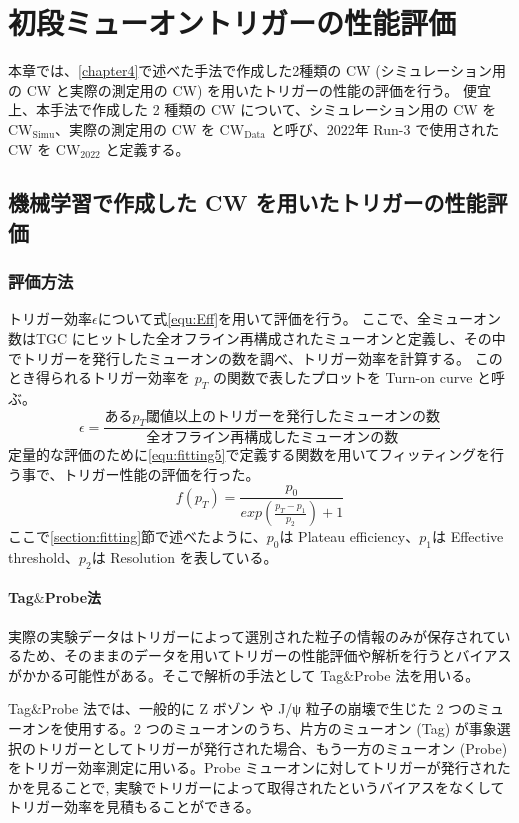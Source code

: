 \chapter{初段ミューオントリガーの性能評価}
本章では、\ref{chapter4}で述べた手法で作成した2種類の CW (シミュレーション用の CW と実際の測定用の CW) を用いたトリガーの性能の評価を行う。
便宜上、本手法で作成した 2 種類の CW について、シミュレーション用の CW を $\mathrm{CW_{Simu}}$、実際の測定用の CW を $\mathrm{CW_{Data}}$ と呼び、2022年 Run-3 で使用された CW を $\mathrm{CW_{2022}}$ と定義する。

\section{機械学習で作成した CW を用いたトリガーの性能評価}
\subsection{評価方法}
トリガー効率$\epsilon$について式\ref{equ:Eff}を用いて評価を行う。
ここで、全ミューオン数はTGC にヒットした全オフライン再構成されたミューオンと定義し、その中でトリガーを発行したミューオンの数を調べ、トリガー効率を計算する。
このとき得られるトリガー効率を $p_T$ の関数で表したプロットを Turn-on curve と呼ぶ。
\begin{equation}
　   \epsilon = \frac{ある p_T 閾値以上のトリガーを発行したミューオンの数}{全オフライン再構成したミューオンの数}
　\label{equ:Eff}
\end{equation}
定量的な評価のために\eqref{equ:fitting5}で定義する関数を用いてフィッティングを行う事で、トリガー性能の評価を行った。
\begin{equation}
    f(p_T) = \frac{p_0}{exp(\frac{p_T-p_1}{p_2})+1}
　\label{equ:fitting5}
\end{equation}
ここで\ref{section:fitting}節で述べたように、$p_0$は Plateau efficiency、$p_1$は Effective threshold、$p_2$は Resolution を表している。

\subsubsection{Tag$\&$Probe法}
実際の実験データはトリガーによって選別された粒子の情報のみが保存されているため、そのままのデータを用いてトリガーの性能評価や解析を行うとバイアスがかかる可能性がある。そこで解析の手法として Tag$\&$Probe 法を用いる。

Tag$\&$Probe 法では、一般的に Z ボゾン や J/ψ 粒子の崩壊で生じた 2 つのミューオンを使用する。2 つのミューオンのうち、片方のミューオン (Tag) が事象選択のトリガーとしてトリガーが発行された場合、もう一方のミューオン (Probe) をトリガー効率測定に用いる。Probe ミューオンに対してトリガーが発行されたかを見ることで, 実験でトリガーによって取得されたというバイアスをなくしてトリガー効率を見積もることができる。

